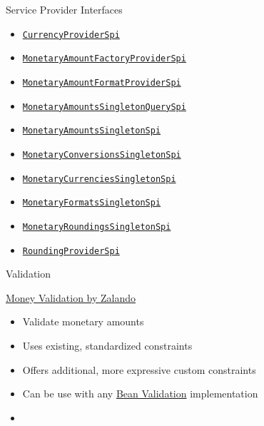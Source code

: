 \documentclass{beamer}
\newcommand{\code}[1]{\texttt{#1}}
\newcommand{\listing}[1]{
	\begin{itemize}
		\item[]
	\end{itemize}
}
\newcommand{\slideItems}[1]{
	\begin{itemize}
		#1
	\end{itemize}
}
\newcommand{\slide}[2]{
	\begin{frame}{#1}
		#2
	\end{frame}
}
\begin{document}
\slide{Service Provider Interfaces}{
	\slideItems{
		\item \code{\href{https://github.com/JavaMoney/jsr354-api/blob/master/src/main/java/javax/money/spi/CurrencyProviderSpi.java}{CurrencyProviderSpi}}
		\item \code{\href{https://github.com/JavaMoney/jsr354-api/blob/master/src/main/java/javax/money/spi/MonetaryAmountFactoryProviderSpi.java}{MonetaryAmountFactoryProviderSpi}}
		\item \code{\href{https://github.com/JavaMoney/jsr354-api/blob/master/src/main/java/javax/money/spi/MonetaryAmountFormatProviderSpi.java}{MonetaryAmountFormatProviderSpi}}
		\item \code{\href{https://github.com/JavaMoney/jsr354-api/blob/master/src/main/java/javax/money/spi/MonetaryAmountsSingletonQuerySpi.java}{MonetaryAmountsSingletonQuerySpi}}
		\item \code{\href{https://github.com/JavaMoney/jsr354-api/blob/master/src/main/java/javax/money/spi/MonetaryAmountsSingletonSpi.java}{MonetaryAmountsSingletonSpi}}
		\item \code{\href{https://github.com/JavaMoney/jsr354-api/blob/master/src/main/java/javax/money/spi/MonetaryConversionsSingletonSpi.java}{MonetaryConversionsSingletonSpi}}
		\item \code{\href{https://github.com/JavaMoney/jsr354-api/blob/master/src/main/java/javax/money/spi/MonetaryCurrenciesSingletonSpi.java}{MonetaryCurrenciesSingletonSpi}}
		\item \code{\href{https://github.com/JavaMoney/jsr354-api/blob/master/src/main/java/javax/money/spi/MonetaryFormatsSingletonSpi.java}{MonetaryFormatsSingletonSpi}}
		\item \code{\href{https://github.com/JavaMoney/jsr354-api/blob/master/src/main/java/javax/money/spi/MonetaryRoundingsSingletonSpi.java}{MonetaryRoundingsSingletonSpi}}
		\item \code{\href{https://github.com/JavaMoney/jsr354-api/blob/master/src/main/java/javax/money/spi/RoundingProviderSpi.java}{RoundingProviderSpi}}
	}
}

\slide{Validation}{
	\href{https://github.com/zalando/money-validation}{Money Validation by Zalando}
	\slideItems{
		\item Validate monetary amounts
		\item Uses existing, standardized constraints
		\item Offers additional, more expressive custom constraints
		\item Can be use with any \href{http://beanvalidation.org/}{Bean Validation} implementation
	}
	\listing{validation.java}
}
\end{document}
